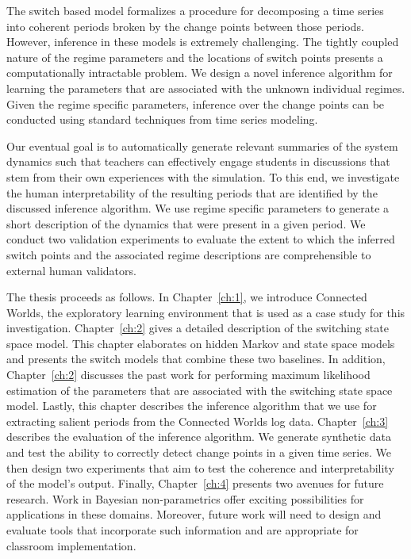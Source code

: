 The switch based model formalizes a procedure for decomposing a time series into coherent periods broken by the change points between those periods. However, inference in these models is extremely challenging. The tightly coupled nature of the regime parameters and the locations of switch points presents a computationally intractable problem. We design a novel inference algorithm for learning the parameters that are associated with the unknown individual regimes. Given the regime specific parameters, inference over the change points can be conducted using standard techniques from time series modeling.

Our eventual goal is to automatically generate relevant summaries of the system dynamics such that teachers can effectively engage students in discussions that stem from their own experiences with the simulation. To this end, we investigate the human interpretability of the resulting periods that are identified by the discussed inference algorithm. We use regime specific parameters to generate a short description of the dynamics that were present in a given period. We conduct two validation experiments to evaluate the extent to which the inferred switch points and the associated regime descriptions are comprehensible to external human validators.

The thesis proceeds as follows. In Chapter~\ref{ch:1}, we introduce Connected Worlds, the exploratory learning environment that is used as a case study for this investigation. Chapter~\ref{ch:2} gives a detailed description of the switching state space model. This chapter elaborates on hidden Markov and state space models and presents the switch models that combine these two baselines. In addition, Chapter~\ref{ch:2} discusses the past work for performing maximum likelihood estimation of the parameters that are associated with the switching state space model. Lastly, this chapter describes the inference algorithm that we use for extracting salient periods from the Connected Worlds log data. Chapter~\ref{ch:3} describes the evaluation of the inference algorithm. We generate synthetic data and test the ability to correctly detect change points in a given time series. We then design two experiments that aim to test the coherence and interpretability of the model's output. Finally, Chapter~\ref{ch:4} presents two avenues for future research. Work in Bayesian non-parametrics offer exciting possibilities for applications in these domains. Moreover, future work will need to design and evaluate tools that incorporate such information and are appropriate for classroom implementation.


